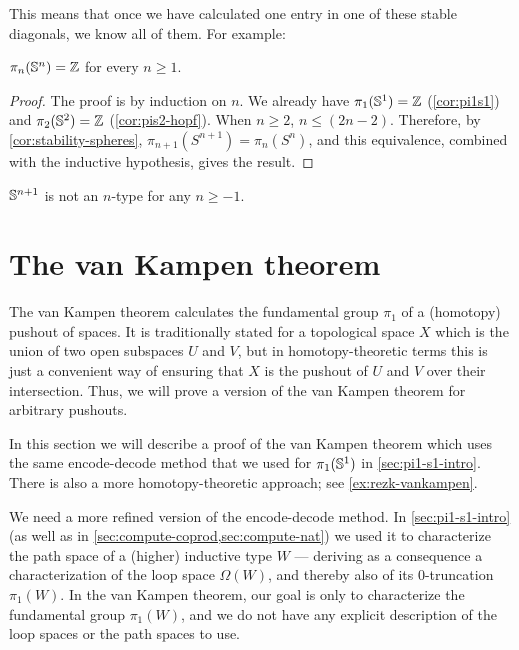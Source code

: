 This means that once we have calculated one entry in one of these stable
diagonals, we know all of them.  For example:
\begin{thm}
$\pi_n(\mathbb{S}^n)=\mathbb{Z}$ for every $n\geq 1$. 
\end{thm}

\begin{proof}
The proof is by induction on $n$.  We already have $\pi_1(\mathbb{S} ^1) = \mathbb{Z}$
(\autoref{cor:pi1s1}) and $\pi_2(\mathbb{S} ^2) = \mathbb{Z}$ (\autoref{cor:pis2-hopf}).
When $n \ge 2$, $n \le (2n - 2)$. Therefore, by
\cref{cor:stability-spheres}, $\pi_{n+1}(S^{n+1}) = \pi_{n}(S^{n})$, and
this equivalence, combined with the inductive hypothesis, gives the result.  
\end{proof}

\begin{cor}
  $\mathbb{S}^{n+1}$ is not an $n$-type for any $n\ge -1$.
\end{cor}

\section{The van Kampen theorem}
\label{sec:van-kampen}

%
%

%
The van Kampen theorem calculates the fundamental group $\pi_1$ of a (homotopy) pushout of spaces.
It is traditionally stated for a topological space $X$ which is the union of two open subspaces $U$ and $V$, but in homotopy-theoretic terms this is just a convenient way of ensuring that $X$ is the pushout of $U$ and $V$ over their intersection.
Thus, we will prove a version of the van Kampen theorem for arbitrary pushouts.

In this section we will describe a proof of the van Kampen theorem which uses the same encode-decode method that we used for $\pi_1(\mathbb{S}^1)$ in \autoref{sec:pi1-s1-intro}.
There is also a more homotopy-theoretic approach; see \autoref{ex:rezk-vankampen}.

We need a more refined version of the encode-decode method.
In \autoref{sec:pi1-s1-intro} (as well as in \autoref{sec:compute-coprod,sec:compute-nat}) we used it to characterize the path space of a (higher) inductive type $W$ --- deriving as a consequence a characterization of the loop space $\Omega(W)$, and thereby also of its 0-truncation $\pi_1(W)$.
In the van Kampen theorem, our goal is only to characterize the fundamental group $\pi_1(W)$, and we do not have any explicit description of the loop spaces or the path spaces to use.

